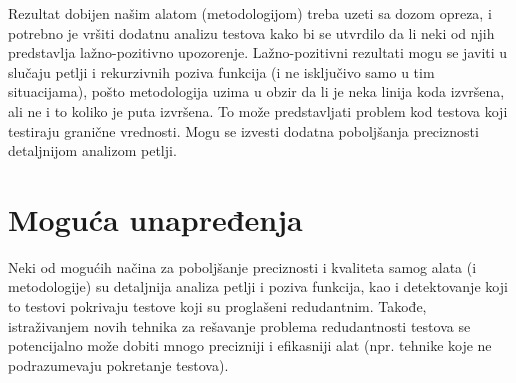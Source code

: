\documentclass[a4paper]{article}
\begin{document}
Rezultat dobijen našim alatom (metodologijom) treba uzeti sa dozom opreza, i potrebno je vršiti dodatnu analizu testova kako bi se utvrdilo da li neki od njih predstavlja lažno-pozitivno upozorenje. Lažno-pozitivni rezultati mogu se javiti u slučaju petlji i rekurzivnih poziva funkcija (i ne isključivo samo u tim situacijama), pošto metodologija uzima u obzir da li je neka linija koda izvršena, ali ne i to koliko je puta izvršena. To može predstavljati problem kod testova koji testiraju granične vrednosti. Mogu se izvesti dodatna poboljšanja preciznosti detaljnijom analizom petlji.

\section{Moguća unapređenja}
\label{sec:unapredjenja}
Neki od mogućih načina za poboljšanje preciznosti i kvaliteta samog alata (i metodologije) su detaljnija analiza petlji i poziva funkcija, kao i detektovanje koji to testovi pokrivaju testove koji su proglašeni redudantnim. Takođe, istraživanjem novih tehnika za rešavanje problema redudantnosti testova se potencijalno može dobiti mnogo precizniji i efikasniji alat (npr. tehnike koje ne podrazumevaju pokretanje testova).
\end{document}
